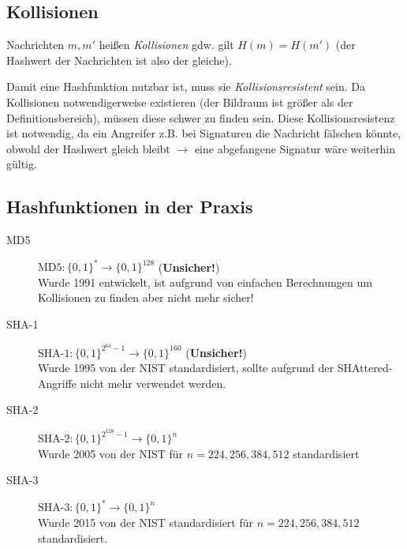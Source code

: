 \documentclass[a4paper, 11pt, accentcolor = tud3b]{tudreport}
\begin{document}
            \subsection{Kollisionen}
	            Nachrichten \(m, m'\) heißen \textit{Kollisionen} gdw. gilt \( H(m) = H(m') \) (der Hashwert der Nachrichten ist also der gleiche).
	            
	            Damit eine Hashfunktion nutzbar ist, muss sie \textit{Kollisionsresistent} sein. Da Kollisionen notwendigerweise existieren (der Bildraum ist größer als der Definitionsbereich), müssen diese schwer zu finden sein. Diese Kollisionsresistenz ist notwendig, da ein Angreifer z.B. bei Signaturen die Nachricht fälschen könnte, obwohl der Hashwert gleich bleibt \(\rightarrow\) eine  abgefangene Signatur wäre weiterhin gültig.
            
            \subsection{Hashfunktionen in der Praxis}
	            \begin{description}
	            	\item[MD5] \( \text{MD5} : \{0,1\}^* \rightarrow \{0,1\}^{128} \) \hfill(\textbf{Unsicher!}) \\ Wurde 1991 entwickelt, ist aufgrund von einfachen Berechnungen um Kollisionen zu finden aber nicht mehr sicher!
	            	\item[SHA-1] \( \text{SHA-1} : \{0,1\}^{2^{64}-1} \rightarrow \{0,1\}^{160} \) \hfill(\textbf{Unsicher!}) \\ Wurde 1995 von der NIST standardisiert, sollte aufgrund der SHAttered-Angriffe nicht mehr verwendet werden.
	            	\item[SHA-2] \( \text{SHA-2} : \{0,1\}^{2^{128}-1} \rightarrow \{0,1\}^{n} \) \\ Wurde 2005 von der NIST für \( n = 224, 256, 384, 512 \) standardisiert
	            	\item[SHA-3] \( \text{SHA-3} : \{0,1\}^* \rightarrow \{0,1\}^{n} \) \\ Wurde 2015 von der NIST standardisiert für \( n = 224, 256, 384, 512 \) standardisiert.
	            \end{description}
        
\end{document}

